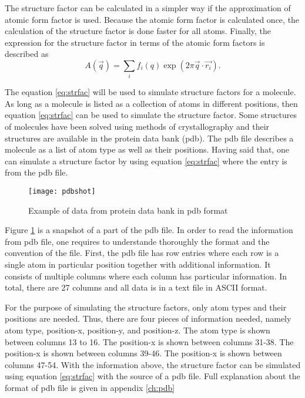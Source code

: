 The structure factor can be calculated in a simpler way if the approximation of atomic form factor is used. Because the atomic form factor is calculated once, the calculation of the structure factor is done faster for all atoms. Finally, the expression for the structure factor in terms of the atomic form factors is described as
\begin{equation}
A(\vec{q})=\sum_{i} f_{i}(q) \exp(2 \pi \vec{q} \cdot \vec{r_i}). 
\label{eq:strfac}
\end{equation}

The equation \ref{eq:strfac} will be used to simulate structure factors for a molecule. As long as a molecule is listed as a collection of atoms in different positions, then equation \ref{eq:strfac} can be used to simulate the structure factor. Some structures of molecules have been solved using methods of crystallography and their structures are available in the protein data bank (pdb). The pdb file describes a molecule as a list of atom type as well as their positions. Having said that, one can simulate a structure factor by using equation \ref{eq:strfac} where the entry is from the pdb file.

\begin{figure}[ht]
  \centering
  \texttt{[image: pdbshot]}
\caption{Example of data from protein data bank in pdb format}
\label{fig:pdbshot}
\end{figure}

Figure \ref{fig:pdbshot} is a snapshot of a part of the pdb file. In order to read the information from pdb file, one requires to understande thoroughly the format and the convention of the file. First, the pdb file has row entries where each row is a single atom in particular position together with additional information. It consists of multiple columns where each column has particular information. In total, there are 27 columns and all data is in a text file in ASCII format. 

For the purpose of simulating the structure factors, only atom types and their positions are needed. Thus, there are four pieces of information needed, namely atom type, position-x, position-y, and position-z. The atom type is shown between columns 13 to 16. The position-x is shown between columns 31-38. The position-x is shown between columns 39-46. The position-x is shown between columns 47-54. With the information above, the structure factor can be simulated using equation \ref{eq:strfac} with the source of a pdb file. Full explanation about the format of pdb file is given in appendix \ref{ch:pdb}

